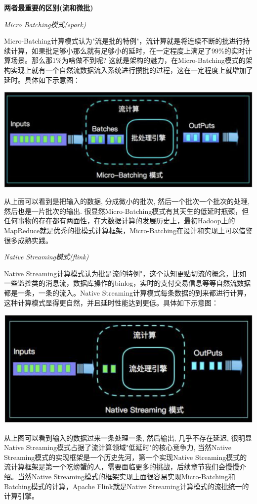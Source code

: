 \documentclass{ctexart}
\begin{document}
\textbf{两者最重要的区别(流和微批)}

\textit{Micro Batching模式(spark)}

Micro-Batching计算模式认为"流是批的特例"，流计算就是将连续不断的批进行持续计算，如果批足够小那么就有足够小的延时，在一定程度上满足了99\%的实时计算场景。那么那1\%为啥做不到呢? 这就是架构的魅力，在Micro-Batching模式的架构实现上就有一个自然流数据流入系统进行攒批的过程，这在一定程度上就增加了延时。具体如下示意图：

\includegraphics[width=\linewidth]{sparkstreamingvsflink1.png}

从上面可以看到是把输入的数据, 分成微小的批次, 然后一个批次一个批次的处理, 然后也是一片批次的输出. 很显然Micro-Batching模式有其天生的低延时瓶颈，但任何事物的存在都有两面性，在大数据计算的发展历史上，最初Hadoop上的MapReduce就是优秀的批模式计算框架，Micro-Batching在设计和实现上可以借鉴很多成熟实践。

\textit{Native Streaming模式(flink)}

Native Streaming计算模式认为批是流的特例"，这个认知更贴切流的概念，比如一些监控类的消息流，数据库操作的binlog，实时的支付交易信息等等自然流数据都是一条，一条的流入。Native Streaming计算模式每条数据的到来都进行计算，这种计算模式显得更自然，并且延时性能达到更低。具体如下示意图：

\includegraphics[width=\textwidth]{sparkstreamingvsflink2.png}

从上图可以看到输入的数据过来一条处理一条, 然后输出, 几乎不存在延迟, 很明显Native Streaming模式占据了流计算领域"低延时"的核心竞争力, 当然Native Streaming模式的实现框架是一个历史先河，第一个实现Native Streaming模式的流计算框架是第一个吃螃蟹的人，需要面临更多的挑战，后续章节我们会慢慢介绍。当然Native Streaming模式的框架实现上面很容易实现Micro-Batching和Batching模式的计算，Apache Flink就是Native Streaming计算模式的流批统一的计算引擎。
\end{document}
